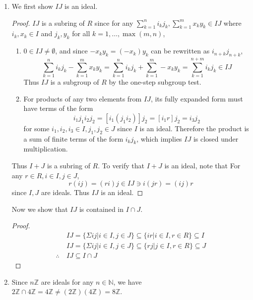 \documentclass{article}
\theoremstyle{plain}
\newcommand{\N}{\mathbb{N}}
\newcommand{\Z}{\mathbb{Z}}
\begin{document}
\begin{enumerate}
	\item We first show $IJ$ is an ideal.
	      \begin{proof}
		      $IJ$ is a subring of $R$ since for any
		      $\sum^{n}_{k=1}i_{k}j_{k},\sum^{m}_{k=1}x_{k}y_{k}\in IJ$ where $i_{k},x_{k}\in I$ and
		      $j_{k},y_{k}$ for all $k=1,\ldots,\max(m,n)$,
		      \begin{enumerate}
			      \item $0\in IJ\neq\emptyset$, and since $-x_{k}y_{k}=(-x_{k})y_{k}$ can be rewritten as $i_{n+k}j_{n+k}$,
			            \[\sum^{n}_{k=1}i_{k}j_{k}-\sum^{m}_{k=1}x_{k}y_{k}=
				            \sum^{n}_{k=1}i_{k}j_{k}+\sum^{m}_{k=1}-x_{k}y_{k}=
				            \sum^{n+m}_{k=1}i_{k}j_{k} \in IJ\]
			            Thus $IJ$ is a subgroup of $R$ by the one-step subgroup test.
			      \item For products of any two elements from $IJ$, its fully expanded form
			            must have terms of the form
			            \[i_{1}j_{1}i_{2}j_{2}=[i_{1}(j_{1}i_{2})]j_{2}=[i_{1}r]j_{2}=i_{3}j_{2}\]
			            for some $i_{1},i_{2},i_{3}\in I, j_{1},j_{2}\in J$ since $I$ is an
			            ideal. Therefore the product is a sum of finite terms of the form
			            $i_{k}j_{k}$, which implies $IJ$ is closed under multiplication.
		      \end{enumerate}
		      Thus $I+J$ is a subring of $R$. To verify that $I+J$ is an ideal, note that
		      For any $r\in R, i\in I, j\in J$, \[r(ij)=(ri)j\in IJ\ni i(jr)=(ij)r\] since $I,J$
		      are ideals. Thus $IJ$ is an ideal.
	      \end{proof}
	      Now we show that $IJ$ is contained in $I\cap J$.
	      \begin{proof}
		      \begin{align*}
			                   & IJ=\{\Sigma ij|i\in I,j\in J\}\subseteq\{ir|i\in I,r\in R\}\subseteq I \\
			                   & IJ=\{\Sigma ij|i\in I,j\in J\}\subseteq\{rj|j\in I,r\in R\}\subseteq J \\
			      \therefore\  & IJ\subseteq I\cap J
		      \end{align*}
	      \end{proof}

	\item Since $n\Z$ are ideals for any $n\in\N$, we have
	      $2\Z\cap4\Z=4\Z\neq(2\Z)(4\Z)=8\Z$.


\end{enumerate}
\end{document}
